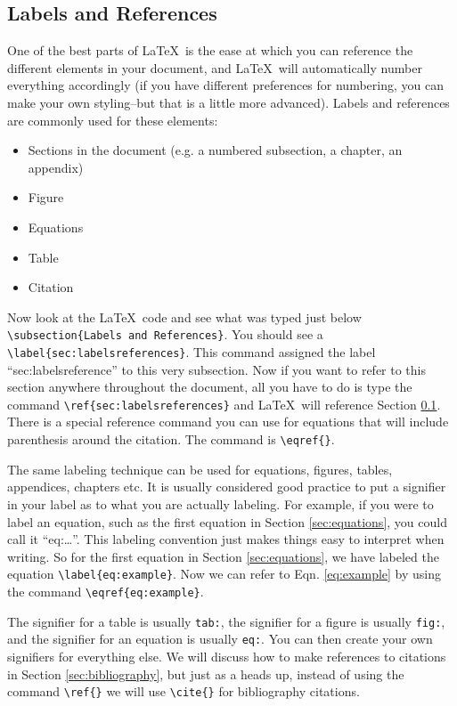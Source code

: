 \documentclass[]{article}%
\newcommand{\bs}{\textbackslash}
\newcommand{\TT}[1]{\texttt{#1}}
\newcommand{\tpc}{\textperiodcentered}
\theoremstyle{definition}
\begin{document}
	\subsection{Labels and References}
	\label{sec:labelsreferences}
	One of the best parts of \LaTeX\ is the ease at which you can reference the different elements in your document, and \LaTeX\ will automatically number everything accordingly (if you have different preferences for numbering, you can make your own styling--but that is a little more advanced).
	Labels and references are commonly used for these elements:
	\begin{itemize}
		\item Sections in the document (e.g. a numbered subsection, a chapter, an appendix)
		\item Figure
		\item Equations
		\item Table
		\item Citation
	\end{itemize} 
	Now look at the \LaTeX\ code and see what was typed just below \TT{\bs subsection\{Labels and References\}}. You should see a \TT{\bs label\{sec:labelsreferences\}}.
	This command assigned the label ``sec:labelsreference'' to this very subsection.
	Now if you want to refer to this section anywhere throughout the document, all you have to do is type the command \TT{\bs ref\{sec:labelsreferences\}} and \LaTeX\ will reference Section \ref{sec:labelsreferences}.
	There is a special reference command you can use for equations that will include parenthesis around the citation.
	The command is \TT{\bs eqref\{\tpc\}}.
	
	The same labeling technique can be used for equations, figures, tables, appendices, chapters etc.
	It is usually considered good practice to put a signifier in your label as to what you are actually labeling.
	For example, if you were to label an equation, such as the first equation in Section \ref{sec:equations}, you could call it ``eq:\dots''.
	This labeling convention just makes things easy to interpret when writing.
	So for the first equation in Section \ref{sec:equations}, we have labeled the equation \TT{\bs label\{eq:example\}}.
	Now we can refer to Eqn. \eqref{eq:example} by using the command \TT{\bs eqref\{eq:example\}}.
	
	The signifier for a table is usually \TT{tab:}, the signifier for a figure is usually \TT{fig:}, and the signifier for an equation is usually \texttt{eq:}.
	You can then create your own signifiers for everything else.
	We will discuss how to make references to citations in Section \ref{sec:bibliography}, but just as a heads up, instead of using the command \TT{\bs ref\{\tpc\}} we will use \TT{\bs cite\{\tpc\}} for bibliography citations.
	
\end{document}

